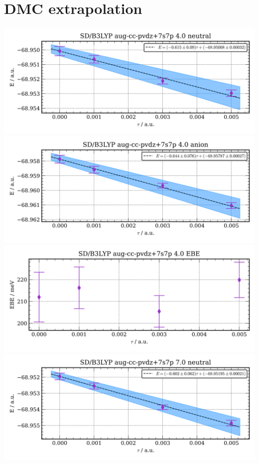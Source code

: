 \section{DMC extrapolation}
\includegraphics[width=\textwidth,keepaspectratio]{images/SDshivB3LYP__aug-cc-pvdz+7s7p__4p0_01_neutral.png}
\includegraphics[width=\textwidth,keepaspectratio]{images/SDshivB3LYP__aug-cc-pvdz+7s7p__4p0_02_anion.png}
\includegraphics[width=\textwidth,keepaspectratio]{images/SDshivB3LYP__aug-cc-pvdz+7s7p__4p0_03_ebe.png}
\includegraphics[width=\textwidth,keepaspectratio]{images/SDshivB3LYP__aug-cc-pvdz+7s7p__7p0_01_neutral.png}
